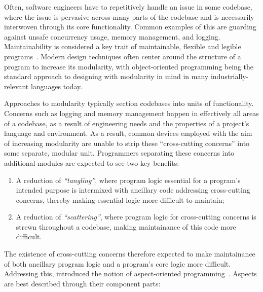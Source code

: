 
Often, software engineers have to repetitively handle an issue in some codebase,
where the issue is pervasive across many parts of the codebase and is
necessarily interwoven through its core functionality. Common examples of this
are guarding against unsafe concurrency usage, memory management, and logging.
Maintainability is considered a key trait of maintainable, flexible and legible
programs~\cite{Parnas_1972}. Modern design techniques often center around the
structure of a program to increase its modularity, with object-oriented
programming being the standard approach to designing with modularity in mind in
many industrially-relevant languages today. 

Approaches to modularity typically section codebases into units of
functionality. Concerns such as logging and memory management happen in
effectively all areas of a codebase, as a result of engineering needs and the
properties of a project's language and environment. As a result, common devices
employed with the aim of increasing modularity are unable to strip these
``cross-cutting concerns'' into some separate, modular unit. Programmers
separating these concerns into additional modules are expected to see two key
benefits:

\begin{enumerate}
    \item A reduction of \emph{``tangling''}, where program logic essential for
    a program's intended purpose is intermixed with ancillary code addressing
    cross-cutting concerns, thereby making essential logic more difficult to maintain;
    \item A reduction of \emph{``scattering''}, where program logic for
    cross-cutting concerns is strewn throughout a codebase, making maintainance
    of this code more difficult.
\end{enumerate}

The existence of cross-cutting concerns therefore expected to make maintainance
of both ancillary program logic and a program's core logic more difficult.
Addressing this, \citeauthor{kiczales1997aspect} introduced the notion of
aspect-oriented programming~\cite{kiczales1997aspect}. Aspects are best
described through their component parts:

